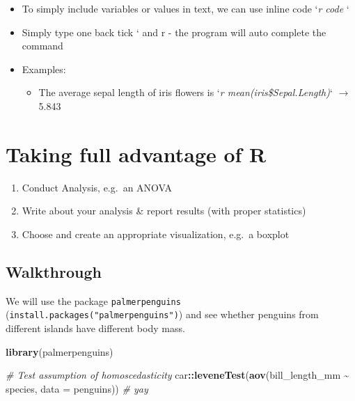 \documentclass[
]{book}
\newenvironment{Shaded}{\begin{snugshade}}{\end{snugshade}}
\newcommand{\AttributeTok}[1]{\textcolor[rgb]{0.13,0.29,0.53}{#1}}
\newcommand{\CommentTok}[1]{\textcolor[rgb]{0.56,0.35,0.01}{\textit{#1}}}
\newcommand{\FunctionTok}[1]{\textcolor[rgb]{0.13,0.29,0.53}{\textbf{#1}}}
\newcommand{\NormalTok}[1]{#1}
\newcommand{\SpecialCharTok}[1]{\textcolor[rgb]{0.81,0.36,0.00}{\textbf{#1}}}
\providecommand{\tightlist}{%
  \setlength{\itemsep}{0pt}\setlength{\parskip}{0pt}}
\begin{document}
\begin{itemize}
\tightlist
\item
  To simply include variables or values in text, we can use inline code `\emph{r code} `
\item
  Simply type one back tick ` and r - the program will auto complete the command
\item
  Examples:

  \begin{itemize}
  \tightlist
  \item
    The average sepal length of iris flowers is
    `\emph{r mean(iris\$Sepal.Length)}` \(\rightarrow\) 5.843
  \end{itemize}
\end{itemize}

\section{Taking full advantage of R}\label{taking-full-advantage-of-r}

\begin{enumerate}
\def\labelenumi{\arabic{enumi}.}
\tightlist
\item
  Conduct Analysis, e.g.~an ANOVA
\item
  Write about your analysis \& report results (with proper statistics)
\item
  Choose and create an appropriate visualization, e.g.~a boxplot
\end{enumerate}

\subsection{Walkthrough}\label{walkthrough}

We will use the package \texttt{palmerpenguins} (\texttt{install.packages("palmerpenguins")}) and see whether penguins from different islands have different body mass.

\begin{Shaded}
\begin{Highlighting}[]
\FunctionTok{library}\NormalTok{(palmerpenguins)}

\CommentTok{\# Test assumption of homoscedasticity}
\NormalTok{car}\SpecialCharTok{::}\FunctionTok{leveneTest}\NormalTok{(}\FunctionTok{aov}\NormalTok{(bill\_length\_mm }\SpecialCharTok{\textasciitilde{}}\NormalTok{ species, }\AttributeTok{data =}\NormalTok{ penguins)) }\CommentTok{\# yay}
\end{Highlighting}
\end{Shaded}
\end{document}

